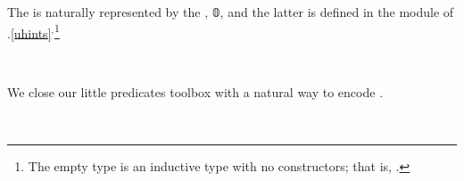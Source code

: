 \ccpad
The  is naturally represented by the , \af 𝟘, and the latter is defined in the  module of \typtop.\cref{uhints}$^, $\footnote{%
The empty type is an inductive type with no constructors; that is, \AgdaSpace{}%
\AgdaSpace{}%
\AgdaSymbol{\{}\AgdaSymbol{\}}\AgdaSpace{}%
\AgdaSymbol{:}\AgdaSpace{}%
\AgdaSpace{}%
\AgdaSpace{}%
\AgdaSpace{}%
.}
\ccpad
\begin{code}
\>[0]\AgdaSpace{}%
\AgdaSymbol{:}\AgdaSpace{}%
\AgdaSpace{}%
\AgdaSpace{}%
\<%
\\
\>[0]\AgdaSpace{}%
\AgdaSymbol{\AgdaUnderscore{}}\AgdaSpace{}%
\AgdaSymbol{=}\AgdaSpace{}%
\<%
\end{code}
\ccpad
We close our little predicates toolbox with a natural way to encode .
\ccpad
\begin{code}
\>[0]\AgdaSpace{}%
\AgdaSymbol{:}\AgdaSpace{}%
\AgdaSpace{}%
\AgdaSpace{}%
\AgdaSpace{}%
\AgdaSpace{}%
\AgdaSymbol{\AgdaUnderscore{}}\<%
\\
\>[0]\AgdaSpace{}%
\AgdaSpace{}%
\AgdaSpace{}%
\AgdaSymbol{=}\AgdaSpace{}%
\AgdaSpace{}%
\<%
\end{code}





